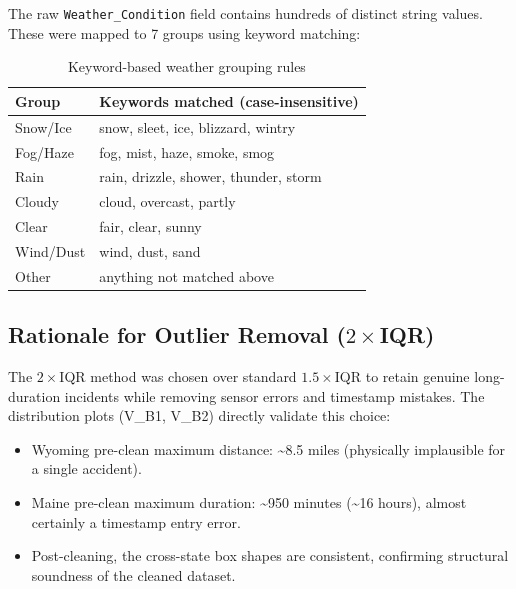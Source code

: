 The raw \texttt{Weather\_Condition} field contains hundreds of distinct string
values. These were mapped to 7 groups using keyword matching:
\begin{table}[!htbp]
\centering\small
\begin{tabular}{@{} l p{9cm} @{}}
  \toprule
  \textbf{Group}  & \textbf{Keywords matched (case-insensitive)} \\ \midrule
  Snow/Ice   & snow, sleet, ice, blizzard, wintry \\
  Fog/Haze   & fog, mist, haze, smoke, smog \\
  Rain       & rain, drizzle, shower, thunder, storm \\
  Cloudy     & cloud, overcast, partly \\
  Clear      & fair, clear, sunny \\
  Wind/Dust  & wind, dust, sand \\
  Other      & anything not matched above \\
  \bottomrule
\end{tabular}
\caption{Keyword-based weather grouping rules}
\end{table}
\vspace{-10pt}
\subsection{Rationale for Outlier Removal ($2\times$IQR)}

The $2\times$IQR method was chosen over standard $1.5\times$IQR to retain
genuine long-duration incidents while removing sensor errors and timestamp
mistakes. The distribution plots (V\_B1, V\_B2) directly validate this choice:
\begin{itemize}[noitemsep]
  \item Wyoming pre-clean maximum distance: \textasciitilde8.5 miles (physically
        implausible for a single accident).
  \item Maine pre-clean maximum duration: \textasciitilde950 minutes (\textasciitilde16 hours),
        almost certainly a timestamp entry error.
  \item Post-cleaning, the cross-state box shapes are consistent, confirming
        structural soundness of the cleaned dataset.
\end{itemize}

